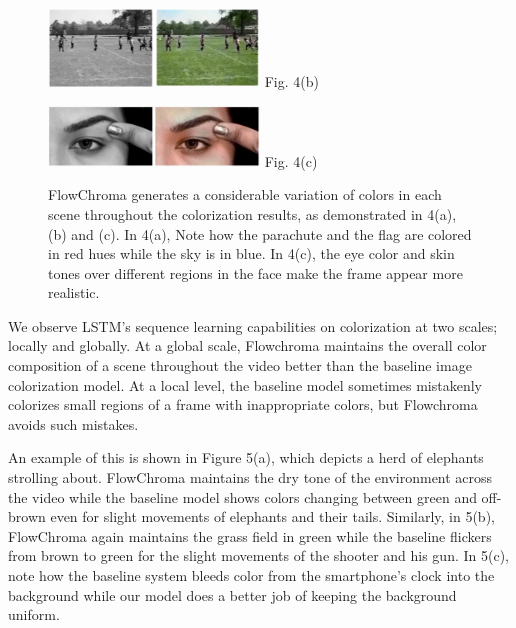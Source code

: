 \documentclass[10pt,twocolumn,letterpaper]{article}
\begin{document}
\begin{figure}[!h]
  \centering
  \includegraphics[width=0.5\textwidth]{bw-fc-fifa.jpg}
  \label{}{\footnotesize Fig. 4(b)}
\end{figure}

\begin{figure}[!h]
  \centering
  \includegraphics[width=0.5\textwidth]{bw-fc-lady-face.jpg}
  \label{}{\footnotesize Fig. 4(c)}
  \caption{FlowChroma generates a considerable variation of colors in each scene throughout the colorization results, as demonstrated in 4(a), (b) and (c). In 4(a), Note how the parachute and the flag are colored in red hues while the sky is in blue. In 4(c), the eye color and skin tones over different regions in the face make the frame appear more realistic.}
\end{figure}

We observe LSTM's sequence learning capabilities on colorization at two scales; locally and globally. At a global scale, Flowchroma maintains the overall color composition of a scene throughout the video better than the baseline image colorization model. At a local level, the baseline model sometimes mistakenly colorizes small regions of a frame with inappropriate colors, but Flowchroma avoids such mistakes.

An example of this is shown in Figure 5(a), which depicts a herd of elephants strolling about. FlowChroma maintains the dry tone of the environment across the video while the baseline model shows colors changing between green and off-brown even for slight movements of elephants and their tails. Similarly, in 5(b), FlowChroma again maintains the grass field in green while the baseline flickers from brown to green for the slight movements of the shooter and his gun. In 5(c), note how the baseline system bleeds color from the smartphone's clock into the background while our model does a better job of keeping the background uniform. 
\end{document}
